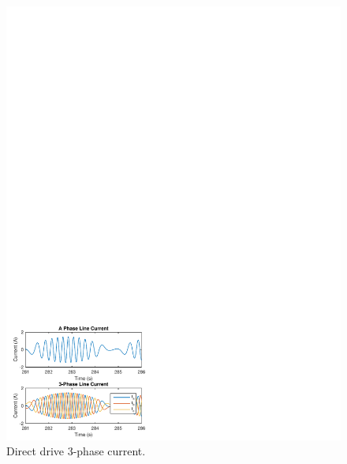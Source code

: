 \documentclass[twocolumn,10pt]{asme2e}
\begin{document}
\begin{figure}[t]
    \centering
    \includegraphics[width=1\columnwidth]{Images/DDIabc}
    \caption{Direct drive 3-phase current.}
    \label{current}
    \end{figure}
\end{document}
